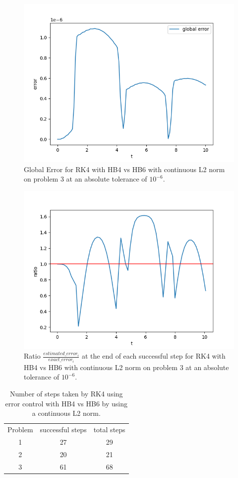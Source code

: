 \begin{figure}[H]
\centering
\includegraphics[width=0.7\linewidth]{./figures/rk4_with_hb4_hb6_L2norm_p3_global_error}
\caption{Global Error for RK4 with HB4 vs HB6 with continuous L2 norm on problem 3 at an absolute tolerance of $10^{-6}$.}
\label{fig:rk4_with_hb4_hb6_L2norm_p3_global_error}
\end{figure}

\begin{figure}[H]
\centering
\includegraphics[width=0.7\linewidth]{./figures/rk4_with_hb4_hb6_L2norm_p3_error_ratio}
\caption{Ratio $\frac{estimated\_error_i}{exact\_error_i}$ at the end of each successful step for RK4 with HB4 vs HB6 with continuous L2 norm on problem 3 at an absolute tolerance of $10^{-6}$.}
\label{fig:rk4_with_hb4_hb6_L2norm_p3_error_ratio}
\end{figure}

\begin{table}[h]
\caption {Number of steps taken by RK4 using error control with HB4 vs HB6 by using a continuous L2 norm.} \label{tab:rk4_with_hb4_hb6_L2norm_nsteps}
\begin{center}
\begin{tabular}{ c c c } 
Problem & successful steps & total steps \\ 
1       & 27                         & 29 \\ 
2       & 20                         & 21 \\
3       & 61                         & 68 \\
\end{tabular}
\end{center}
\end{table}

